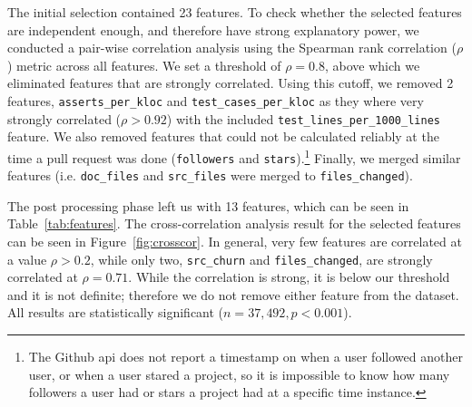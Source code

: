 \documentclass{sig-alternate}
\begin{document}
The initial selection contained 23 features. To check whe\-ther the selected
features are independent enough, and therefore have strong explanatory power, we
conducted a pair-wise correlation analysis using the Spearman rank correlation
($\rho$) metric across all features. We set a threshold of $\rho = 0.8$, above
which we eliminated features that are strongly correlated. Using this cutoff, we
removed 2 features, \texttt{asserts\_per\_kloc} and
\texttt{test\_cases\_per\_kloc} as they where very strongly correlated ($\rho >
0.92$) with the included \texttt{test\_lines\_per\_1000\_lines} feature. We also
removed features that could not be calculated reliably at the time a pull
request was done (\texttt{followers} and \texttt{stars}).\footnote{The Github
{\sc api} does not report a timestamp on when a user followed another user, or
when a user stared a project, so it is impossible to know how many followers a
user had or stars a project had at a specific time instance.} Finally, we
merged similar features (i.e. \texttt{doc\_files} and \texttt{src\_files} were merged to \texttt{files\_changed}). 

The post processing phase left us with
13 features, which can be seen in Table~\ref{tab:features}.
The cross-correlation analysis result for the selected features can be seen in
Figure~\ref{fig:crosscor}. In general, very few features are correlated at a
value $\rho > 0.2$, while only two, \texttt{src\_churn} and
\texttt{files\_changed}, are strongly correlated at $\rho = 0.71$. While the
correlation is strong, it is below our threshold and it is not definite;
therefore we do not remove either feature from the dataset. All results are
statistically significant ($n = 37,492, p < 0.001$).
\end{document}
